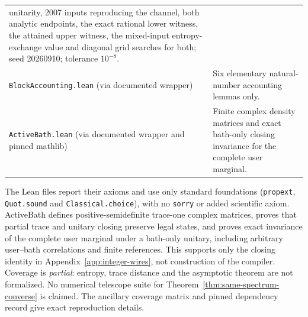 \documentclass[11pt,a4paper]{article}
\numberwithin{equation}{section}
\theoremstyle{plain}
\theoremstyle{definition}
\begin{document}
\begin{center}
\begin{tabular}{@{}>{\raggedright\arraybackslash}p{5.6cm}>{\raggedright\arraybackslash}p{8.8cm}@{}}
unitarity, 2007 inputs reproducing the channel, both analytic endpoints, the
exact rational lower witness, the attained upper witness, the mixed-input
entropy-exchange value and diagonal grid searches for both; seed 20260910;
tolerance $10^{-8}$.\\
\texttt{BlockAccounting.lean} (via documented wrapper) & Six elementary natural-number accounting
lemmas only.\\
\texttt{ActiveBath.lean} (via documented wrapper and pinned mathlib) & Finite complex density
matrices and exact bath-only closing invariance for the complete user marginal.\\
\hline
\end{tabular}
\end{center}

The Lean files report their axioms and use only standard foundations
(\texttt{propext}, \texttt{Quot.sound} and \texttt{Classical.choice}), with no
\texttt{sorry} or added scientific axiom. ActiveBath defines positive-semidefinite
trace-one complex matrices, proves that partial trace and unitary closing
preserve legal states, and proves exact invariance of the complete user marginal
under a bath-only unitary, including arbitrary user--bath correlations and finite
references. This supports only the closing identity in Appendix~\ref{app:integer-wires},
not construction of the compiler. Coverage is \emph{partial}: entropy, trace distance
and the asymptotic theorem are not formalized. No numerical telescope suite for
Theorem~\ref{thm:same-spectrum-converse} is claimed. The ancillary coverage matrix
and pinned dependency record give exact reproduction details.
\end{document}
